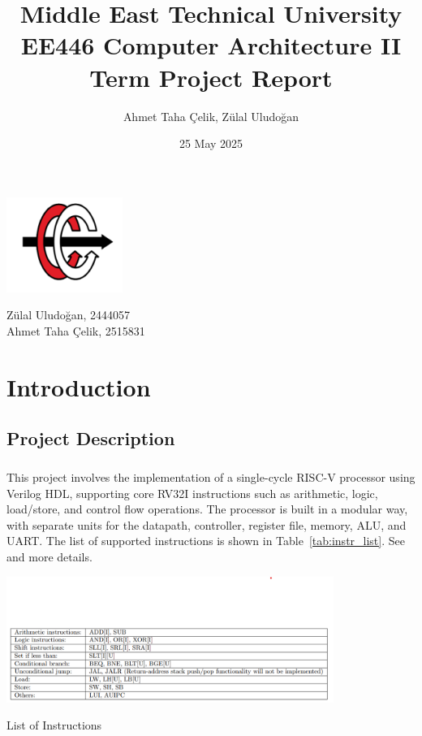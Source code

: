 \documentclass[12pt]{report}
\makeatletter
\renewcommand{\maketitle}{
\begin{center}

\pagestyle{empty}
\phantom{.}  %
\vspace{0.5cm}

{\Huge \bf \@title\par}
\vspace{5cm}

{\LARGE Zülal Uludoğan, 2444057}\\[0.5cm]
{\LARGE Ahmet Taha Çelik, 2515831}

\vfill

{\Large\@date}

\end{center}
}\makeatother
\makeatother
\begin{document}
\begin{center}
    \hspace{0.5cm}\includegraphics[scale=1.2]{figures/metu_eelogo.png}
\end{center}

\title{Middle East Technical University \\[0.5cm]
EE446 Computer Architecture II \\[0.5cm]
Term Project Report}

\author{Ahmet Taha Çelik, Zülal Uludoğan}
\date{25 May 2025}

\maketitle
\tableofcontents

\chapter{Introduction}

\section{Project Description}

\paragraph{}
This project involves the implementation of a single-cycle RISC-V processor using Verilog HDL, supporting core RV32I instructions such as arithmetic, logic, load/store, and control flow operations. The processor is built in a modular way, with separate units for the datapath, controller, register file, memory, ALU, and UART. The list of supported instructions is shown in Table~\ref{tab:instr_list}. See \cite{harris2021}  and \cite{riscv_spec2024} more details.

\vspace{-3em}
\begin{table}[h]
    \centering
    \includegraphics[width=0.8\textwidth]{figures/instr_list.png}
    \caption{List of Instructions}
    \label{tab:instr_list}
\end{table}
\vspace{-1em}
\end{document}
